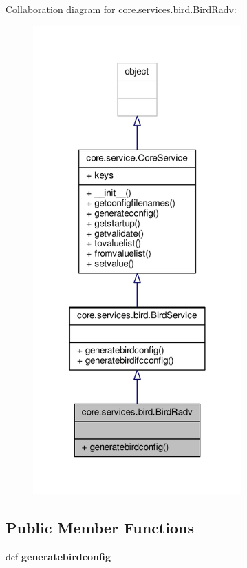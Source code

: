 Collaboration diagram for core.\+services.\+bird.\+Bird\+Radv\+:
\nopagebreak
\begin{figure}[H]
\begin{center}
\leavevmode
\includegraphics[width=227pt]{classcore_1_1services_1_1bird_1_1_bird_radv__coll__graph}
\end{center}
\end{figure}
\subsection*{Public Member Functions}
\begin{DoxyCompactItemize}
\item 
\hypertarget{classcore_1_1services_1_1bird_1_1_bird_radv_ac1f5e54cf7ed1ba83eb9fa0dea01624b}{def {\bfseries generatebirdconfig}}\label{classcore_1_1services_1_1bird_1_1_bird_radv_ac1f5e54cf7ed1ba83eb9fa0dea01624b}

\end{DoxyCompactItemize}
